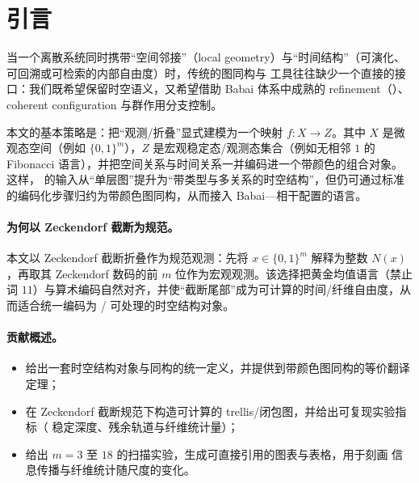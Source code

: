 
\section{引言}

当一个离散系统同时携带“空间邻接”（local geometry）与“时间结构”（可演化、可回溯或可检索的内部自由度）时，传统的图同构与 \WL{} 工具往往缺少一个直接的接口：我们既希望保留时空语义，又希望借助 Babai 体系中成熟的 refinement（\WL{}）、coherent configuration 与群作用分支控制。

本文的基本策略是：把“观测/折叠”显式建模为一个映射 $f:X\to Z$。其中 $X$ 是微观态空间（例如 $\{0,1\}^m$），$Z$ 是宏观稳定态/观测态集合（例如无相邻 $1$ 的 Fibonacci 语言），并把空间关系与时间关系一并编码进一个带颜色的组合对象。这样，\GI{} 的输入从“单层图”提升为“带类型与多关系的时空结构”，但仍可通过标准的编码化步骤归约为带颜色图同构，从而接入 Babai--\WL{}--相干配置的语言。

\paragraph{为何以 Zeckendorf 截断为规范。}
本文以 Zeckendorf 截断折叠作为规范观测：先将 $x\in\{0,1\}^m$ 解释为整数 $N(x)$，再取其 Zeckendorf 数码的前 $m$ 位作为宏观观测。该选择把黄金均值语言（禁止词 $11$）与算术编码自然对齐，并使“截断尾部”成为可计算的时间/纤维自由度，从而适合统一编码为 \GI{}/\WL{} 可处理的时空结构对象。

\paragraph{贡献概述。}
\begin{itemize}
  \item 给出一套时空结构对象与同构的统一定义，并提供到带颜色图同构的等价翻译定理；
  \item 在 Zeckendorf 截断规范下构造可计算的 trellis/闭包图，并给出可复现实验指标（\WL{} 稳定深度、残余轨道与纤维统计量）；
  \item 给出 $m=3$ 至 $18$ 的扫描实验，生成可直接引用的图表与表格，用于刻画 \WL{} 信息传播与纤维统计随尺度的变化。
\end{itemize}

